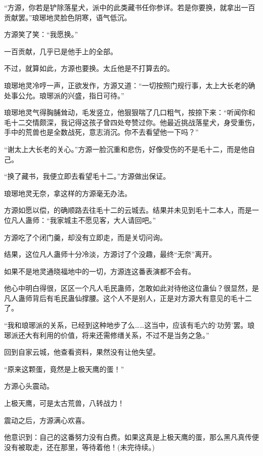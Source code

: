 \begin{this_body}
“方源，你若是铲除落星犬，派中的此类藏书任你参详。若是你要换，就拿出一百贡献罢。”琅琊地灵脸色阴寒，语气低沉。

方源笑了笑：“我愿换。”

一百贡献，几乎已是他手上的全部。

不过，就算如此，方源也要换。太丘他是不打算去的。

琅琊地灵冷哼一声，正欲发作，方源又道：“一切按照门规行事，太上大长老的确处事公允。琅琊派的兴盛，指日可待。”

琅琊地灵气得胸脯耸动，毛发竖立，他狠狠喘了几口粗气，按捺下来：“听闻你和毛十二交情颇深，我记得这孩子曾四处夸赞过你。他最近挑战落星犬，身受重伤，手中的荒兽也是全数战死，意志消沉。你不去看望他一下吗？”

“谢太上大长老的关心。”方源一脸沉重和悲伤，好像受伤的不是毛十二，而是他自己。

“换了藏书，我便立即去看望毛十二。”方源做出保证。

琅琊地灵无奈，拿这样的方源毫无办法。

方源如愿以偿，的确顺路去往毛十二的云城去。结果并未见到毛十二本人，而是一位凡人蛊师：“我家城主不愿见客，大人请回吧。”

方源吃了个闭门羹，却没有立即走，而是关切问询。

结果，这位凡人蛊师十分冷淡，方源讨了个没趣，最终“无奈”离开。

如果不是地灵通晓福地中的一切，方源连这番表演都不会有。

他心中明白得很，区区一个凡人毛民蛊师，怎敢如此对待他这位蛊仙？很显然，是凡人蛊师背后有毛民蛊仙撑腰。这个人不是别人，正是对方源大有意见的毛十二了。

“我和琅琊派的关系，已经到这种地步了么……这当中，应该有毛六的‘功劳’罢。琅琊派还大有利用的价值，将来还需修缮关系，不过不是当务之急。”

回到自家云城，他查看资料，果然没有让他失望。

“原来这颗蛋，竟然是上极天鹰的蛋！”

方源心头震动。

上极天鹰，可是太古荒兽，八转战力！

震动之后，方源满心欢喜。

他意识到：自己的这番努力没有白费。如果这真是上极天鹰的蛋，那么黑凡真传便没有被取走，还在那里，等待着他！(未完待续。)

\end{this_body}

